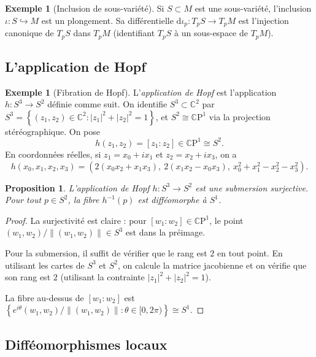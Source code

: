 \documentclass[12pt,a4paper,openany]{book}
\theoremstyle{definition}
\newtheorem{exemple}[definition]{Exemple}
\theoremstyle{plain}
\newtheorem{proposition}[definition]{Proposition}
\theoremstyle{remark}
\newcommand{\C}{\mathbb{C}}
\newcommand{\CP}{\mathbb{C}\mathrm{P}}
\newcommand{\dd}{\mathrm{d}}
\newcommand{\set}[1]{\left\{#1\right\}}
\begin{document}
\begin{exemple}[Inclusion de sous-variété]\label{ex:inclusion}
Si $S \subset M$ est une sous-variété, l'inclusion $\iota \colon S
\hookrightarrow M$ est un plongement. Sa différentielle $\dd\iota_p \colon T_pS
\to T_pM$ est l'injection canonique de $T_pS$ dans $T_pM$ (identifiant $T_pS$
à un sous-espace de $T_pM$).
\end{exemple}

\subsection{L'application de Hopf}

\begin{exemple}[Fibration de Hopf]\label{ex:hopf}
L'\emph{application de Hopf} est l'application $h \colon S^3 \to S^2$ définie
comme suit. On identifie $S^3 \subset \C^2$ par $S^3 = \set{(z_1, z_2) \in
\C^2 : |z_1|^2 + |z_2|^2 = 1}$, et $S^2 \cong \CP^1$ via la projection
stéréographique. On pose
\[
    h(z_1, z_2) = [z_1 : z_2] \in \CP^1 \cong S^2.
\]
En coordonnées réelles, si $z_1 = x_0 + ix_1$ et $z_2 = x_2 + ix_3$, on a
\[
    h(x_0, x_1, x_2, x_3) = (2(x_0 x_2 + x_1 x_3),\ 2(x_1 x_2 - x_0 x_3),
    \ x_0^2 + x_1^2 - x_2^2 - x_3^2).
\]
\end{exemple}

\begin{proposition}\label{prop:hopf-submersion}
L'application de Hopf $h \colon S^3 \to S^2$ est une submersion surjective.
Pour tout $p \in S^2$, la fibre $h^{-1}(p)$ est difféomorphe à $S^1$.
\end{proposition}

\begin{proof}
La surjectivité est claire : pour $[w_1 : w_2] \in \CP^1$, le point $(w_1,
w_2)/\|(w_1, w_2)\| \in S^3$ est dans la préimage.

Pour la submersion, il suffit de vérifier que le rang est $2$ en tout point. En
utilisant les cartes de $S^3$ et $S^2$, on calcule la matrice jacobienne et on
vérifie que son rang est $2$ (utilisant la contrainte $|z_1|^2 + |z_2|^2 = 1$).

La fibre au-dessus de $[w_1 : w_2]$ est $\set{e^{i\theta}(w_1, w_2) /
\|(w_1, w_2)\| : \theta \in [0, 2\pi)} \cong S^1$.
\end{proof}

\subsection{Difféomorphismes locaux}
\end{document}
